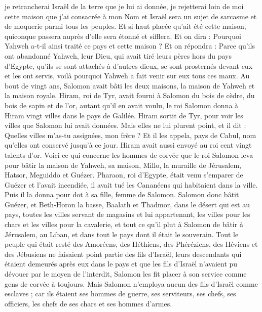 \begin{multicols}{2}
je retrancherai Israël de la terre que je lui ai donnée, je rejetterai loin de moi cette maison que j'ai consacrée à mon Nom et Israël sera un sujet de sarcasme et de moquerie parmi tous les peuples.
Et si haut placée qu’ait été cette maison, quiconque passera auprès d'elle sera étonné et sifflera. Et on dira : Pourquoi Yahweh a-t-il ainsi traité ce pays et cette maison ?
Et on répondra : Parce qu'ils ont abandonné Yahweh, leur Dieu, qui avait tiré leurs pères hors du pays d'Egypte, qu'ils se sont attachés à d'autres dieux, se sont prosternés devant eux et les ont servis, voilà pourquoi Yahweh a fait venir sur eux tous ces maux.
Au bout de vingt ans, Salomon avait bâti les deux maisons, la maison de Yahweh et la maison royale.
Hiram, roi de Tyr, avait fourni à Salomon du bois de cèdre, du bois de sapin et de l'or, autant qu'il en avait voulu, le roi Salomon donna à Hiram vingt villes dans le pays de Galilée.
Hiram sortit de Tyr, pour voir les villes que Salomon lui avait données. Mais elles ne lui plurent point,
et il dit : Quelles villes m'as-tu assignées, mon frère ? Et il les appela, pays de Cabul, nom qu’elles ont conservé jusqu'à ce jour.
Hiram avait aussi envoyé au roi cent vingt talents d'or.
Voici ce qui concerne les hommes de corvée que le roi Salomon leva pour bâtir la maison de Yahweh, sa maison, Millo, la muraille de Jérusalem, Hatsor, Meguiddo et Guézer.
Pharaon, roi d'Egypte, était venu s’emparer de Guézer et l'avait incendiée, il avait tué les Cananéens qui habitaient dans la ville. Puis il la donna pour dot à sa fille, femme de Salomon.
Salomon donc bâtit Guézer, et Beth-Horon la basse,
Baalath et Thadmor, dans le désert qui est au pays,
toutes les villes servant de magasins et lui appartenant, les villes pour les chars et les villes pour la cavalerie, et tout ce qu’il plut à Salomon de bâtir à Jérusalem, au Liban, et dans tout le pays dont il était le souverain.
Tout le peuple qui était resté des Amoréens, des Héthiens, des Phéréziens, des Héviens et des Jébusiens ne faisaient point partie des fils d'Israël,
leurs descendants qui étaient demeurés après eux dans le pays et que les fils d'Israël n'avaient pu dévouer par le moyen de l'interdit, Salomon les fit placer à son service comme gens de corvée à toujours.
Mais Salomon n’employa aucun des fils d'Israël comme esclaves ; car ils étaient ses hommes de guerre, ses serviteurs, ses chefs, ses officiers, les chefs de ses chars et ses hommes d'armes.

\end{multicols}

